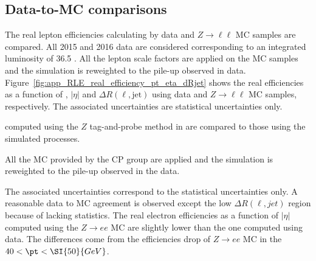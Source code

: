 
\subsection{Data-to-MC comparisons}
\label{subsec:RLE_data_to_mc_comparisons}
The real lepton efficiencies calculating by data and $Z\to \ell\ell$ MC samples are compared.
All 2015 and 2016 data are considered corresponding to an integrated luminosity of 36.5 \ifb.
All the lepton scale factors are applied on the MC samples and the simulation is reweighted to the pile-up observed in data.
Figure~\ref{fig:app_RLE_real_efficiency_pt_eta_dRjet} shows the real efficiencies as a function of \pt, $|\eta|$ and $\Delta R(\ell, \mathrm{jet})$ using data and $Z\to \ell \ell$ MC samples, respectively.
The associated uncertainties are statistical uncertainties only.























  computed using the $Z$ tag-and-probe method in  are compared to those using the simulated  processes.

All the MC  provided by the CP group are applied and the simulation is reweighted to the pile-up observed in the data.

The associated uncertainties correspond to the statistical uncertainties only.
A reasonable data to MC agreement is observed except the low $\Delta R(\ell, jet)$ region because of lacking statistics.
The real electron efficiencies as a function of $|\eta|$ computed using the $Z\to ee$ MC are slightly lower than the one computed using data.
The differences come from the efficiencies drop of $Z\to ee$ MC in the $40<\pt<\SI{50}{GeV}$. 

